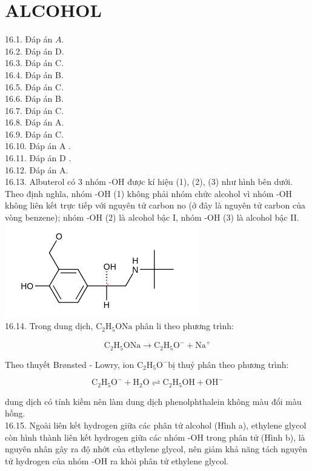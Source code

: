 \documentclass[10pt]{article}
\begin{document}
\section*{ALCOHOL}
16.1. Đáp án $A$.\\
16.2. Đáp án D.\\
16.3. Đáp án C.\\
16.4. Đáp án B.\\
16.5. Đáp án C.\\
16.6. Đáp án B.\\
16.7. Đáp án C.\\
16.8. Đáp án A.\\
16.9. Đáp án C.\\
16.10. Đáp án A .\\
16.11. Đáp án D .\\
16.12. Đáp án A.\\
16.13. Albuterol có 3 nhóm -OH được kí hiệu (1), (2), (3) như hình bên dưới. Theo định nghĩa, nhóm -OH (1) không phải nhóm chức alcohol vì nhóm -OH không liên kết trực tiếp với nguyên tử carbon no (ở đây là nguyên tử carbon của vòng benzene); nhóm -OH (2) là alcohol bậc I, nhóm -OH (3) là alcohol bậc II.\\
\includegraphics{smile-9fd8cad99941f84766700cdb9f2ef00c6e00fbbd}\\
16.14. Trong dung dịch, $\mathrm{C}_{2} \mathrm{H}_{5} \mathrm{ONa}$ phân li theo phương trình:

$$
\mathrm{C}_{2} \mathrm{H}_{5} \mathrm{ONa} \rightarrow \mathrm{C}_{2} \mathrm{H}_{5} \mathrm{O}^{-}+\mathrm{Na}^{+}
$$

Theo thuyết Brønsted - Lowry, ion $\mathrm{C}_{2} \mathrm{H}_{5} \mathrm{O}^{-}$bị thuỷ phân theo phương trình:

$$
\mathrm{C}_{2} \mathrm{H}_{5} \mathrm{O}^{-}+\mathrm{H}_{2} \mathrm{O} \rightleftharpoons \mathrm{C}_{2} \mathrm{H}_{5} \mathrm{OH}+\mathrm{OH}^{-}
$$

dung dịch có tính kiềm nên làm dung dịch phenolphthalein không màu đổi màu hồng.\\
16.15. Ngoài liên kết hydrogen giữa các phân tử alcohol (Hình a), ethylene glycol còn hình thành liên kết hydrogen giữa các nhóm -OH trong phân tử (Hình b), là nguyên nhân gây ra độ nhớt của ethylene glycol, nên giảm khả năng tách nguyên tử hydrogen của nhóm -OH ra khỏi phân tử ethylene glycol.
\end{document}

